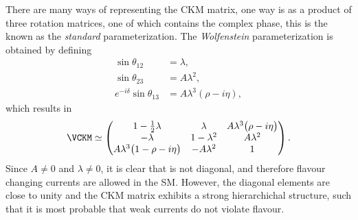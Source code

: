 There are many ways of representing the CKM matrix, one way is as a product of three rotation
matrices, one of which contains the complex phase, this is the known as the \emph{standard}
parameterization.
The \emph{Wolfenstein} parameterization is obtained by defining
\begin{align}
  \sin\theta_{12}&=\lambda, \nonumber\\
  \sin\theta_{23}&=A\lambda^2, \nonumber\\
  e^{-i\delta}\sin\theta_{13} &= A\lambda^3(\rho-i\eta),
\end{align}
which results in
\begin{align}
  \VCKM\simeq
    \begin{pmatrix}
      1-\tfrac12\lambda & \lambda & A\lambda^3\big(\rho-i\eta\big) \\
      -\lambda & 1-\lambda^2 & A\lambda^2 \\
      A\lambda^3\big(1-\rho-i\eta\big) & -A\lambda^2 & 1 \\
    \end{pmatrix}.
  \label{eq:th:wolfenstein}
\end{align}
Since $A\neq0$ and $\lambda\neq0$, it is clear that \VCKM is not diagonal, and therefore flavour
changing currents are allowed in the SM.
However, the diagonal elements are close to unity and the CKM matrix exhibits a strong
hierarchichal structure, such that it is most probable that weak currents do not violate flavour.



